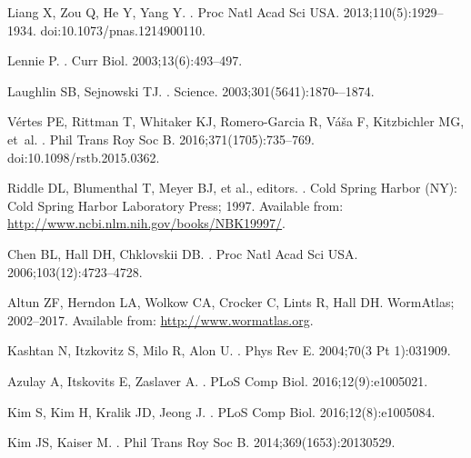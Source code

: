 \documentclass[10pt,letterpaper]{article}
\begin{document}
{\begin{thebibliography}{100}
Liang X, Zou Q, He Y, Yang Y.
.
\newblock Proc Natl Acad Sci USA. 2013;110(5):1929--1934.
\newblock doi:{10.1073/pnas.1214900110}.

Lennie P.
.
\newblock Curr Biol. 2003;13(6):493--497.

Laughlin SB, Sejnowski TJ.
.
\newblock Science. 2003;301(5641):1870-–1874.

V{\'{e}}rtes PE, Rittman T, Whitaker KJ, Romero-Garcia R, V{\'{a}}{\v{s}}a F,
  Kitzbichler MG, et~al.
.
\newblock Phil Trans Roy Soc B. 2016;371(1705):735--769.
\newblock doi:{10.1098/rstb.2015.0362}.

Riddle DL, Blumenthal T, Meyer BJ, et al., editors.
.
\newblock Cold Spring Harbor (NY): Cold Spring Harbor Laboratory Press; 1997.
\newblock Available from: \url{http://www.ncbi.nlm.nih.gov/books/NBK19997/}.


Chen BL, Hall DH, Chklovskii DB.
.
\newblock Proc Natl Acad Sci USA. 2006;103(12):4723--4728.

Altun ZF, Herndon LA, Wolkow CA, Crocker C, Lints R, Hall DH. WormAtlas;
2002--2017.
\newblock Available from: \url{http://www.wormatlas.org}.

Kashtan N, Itzkovitz S, Milo R, Alon U.
.
\newblock Phys Rev E. 2004;70(3 Pt 1):031909.

Azulay A, Itskovits E, Zaslaver A.
.
\newblock PLoS Comp Biol. 2016;12(9):e1005021.

Kim S, Kim H, Kralik JD, Jeong J.
.
\newblock PLoS Comp Biol. 2016;12(8):e1005084.

Kim JS, Kaiser M.
.
\newblock Phil Trans Roy Soc B. 2014;369(1653):20130529.


\end{thebibliography}}
\end{document}

